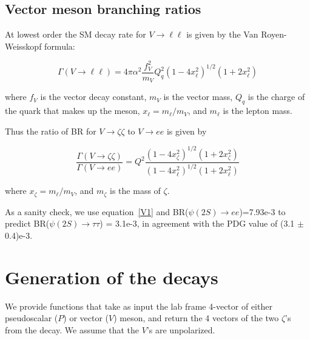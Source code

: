 \documentclass[12pt]{article}
\begin{document}
\subsection{Vector meson branching ratios}

  At lowest order the SM decay rate for $V \to \ell \ell$ is given
  by the Van Royen-Weisskopf formula\cite{VR1,VR2}:

  \begin{equation}
    \Gamma(V \to \ell \ell) = 4 \pi \alpha^2 \frac{f_V^2}{m_V} Q_q^2
    (1-4x_\ell^2)^{1/2} (1+2x_\ell^2)
    \end{equation}

  \noindent where $f_V$ is the vector decay constant, $m_V$ is the
  vector mass, $Q_q$ is the charge of the quark that makes up the meson,
  $x_\ell = m_\ell/m_V$, and $m_\ell$ is the lepton mass.

  \noindent Thus the ratio of BR for $V \to \zeta \zeta$ to $V \to ee$ is
  given by

  \begin{equation} 
    \frac{\Gamma(V \to \zeta \zeta)}{\Gamma(V \to ee)} = Q^2
    \frac{(1-4x_\zeta^2)^{1/2} (1+2x_\zeta^2)}{(1-4x_\ell^2)^{1/2} (1+2x_\ell^2)}
    \label{V1}
    \end{equation}

  \noindent where $x_\zeta = m_\ell/m_V$, and $m_\zeta$ is the mass of $\zeta$.
  
  As a sanity check, we use equation~\ref{V1} and BR($\psi(2S) \to ee$)=7.93e-3
  to predict
  BR($\psi(2S) \to \tau \tau$) = 3.1e-3, in agreement with the PDG value
  of (3.1 $\pm$ 0.4)e-3.

\section{Generation of the decays}

We provide functions that take as input the lab frame 4-vector of either pseudoscalar
($P$) or vector ($V$) meson, and return the 4 vectors of the two $\zeta$'s from the decay.
We assume that the $V$'s are unpolarized.
\end{document}

